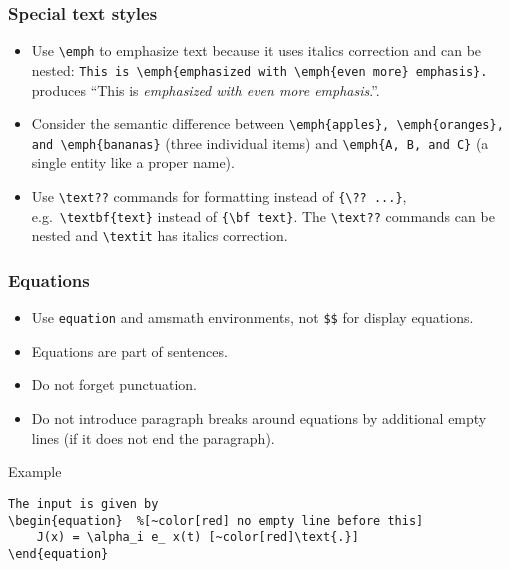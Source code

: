 \documentclass[aspectratio=1610,hyperref={colorlinks,linkcolor=}]{beamer}
\begin{document}
\begin{frame}[fragile]
    \frametitle{Special text styles}
    \begin{itemize}
        \item Use \verb+\emph+ to emphasize text because it uses italics correction and can be nested: \verb+This is \emph{emphasized with \emph{even more} emphasis}.+ produces ``This is \emph{emphasized with \emph{even more} emphasis}.''.
        \item Consider the semantic difference between \verb+\emph{apples}, \emph{oranges}, and \emph{bananas}+ (three individual items) and \verb+\emph{A, B, and C}+ (a single entity like a proper name).
        \item Use \verb+\text??+ commands for formatting instead of \verb+{\?? ...}+, e.g.~\verb+\textbf{text}+ instead of \verb+{\bf text}+. The \verb+\text??+ commands can be nested and \verb+\textit+ has italics correction.
    \end{itemize}
\end{frame}

\begin{frame}[fragile]
    \frametitle{Equations}
    \begin{itemize}
        \item Use \verb+equation+ and amsmath environments, not \verb+$$+ for display equations.
        \item Equations are part of sentences.
        \item Do not forget punctuation.
        \item Do not introduce paragraph breaks around equations by additional empty lines (if it does not end the paragraph).
    \end{itemize}
    \begin{beamerboxesrounded}{Example}
        \begin{Verbatim}[commandchars=~\[\]]
The input is given by
\begin{equation}  %[~color[red] no empty line before this]
    J(x) = \alpha_i e_ x(t) [~color[red]\text{.}]
\end{equation}
        \end{Verbatim}
    \end{beamerboxesrounded}
\end{frame}
\end{document}
